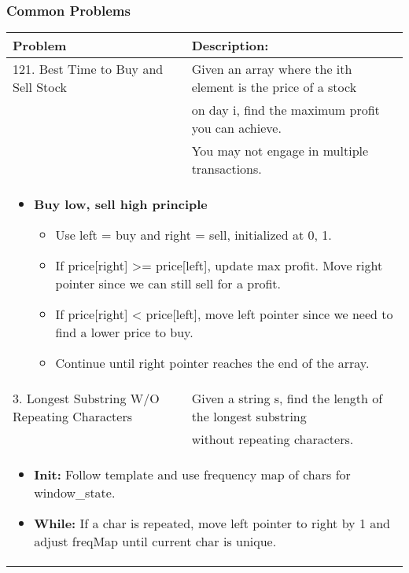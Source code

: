 \subsubsection{Common Problems}
\begin{summary}
    \begin{center}
        \begin{tabular}{ll}
            \toprule
            \textbf{Problem} & \textbf{Description:} \\
            \midrule
            121. Best Time to Buy and Sell Stock & Given an array where the ith element is the price of a stock \\ 
            & on day i, find the maximum profit you can achieve. \\ 
            & You may not engage in multiple transactions. \\
            \multicolumn{2}{p{\linewidth}}{
                \begin{itemize}
                    \item \textbf{Buy low, sell high principle}
                    \begin{itemize}
                        \item Use left = buy and right = sell, initialized at 0, 1. 
                        \item If price[right] >= price[left], update max profit. Move right pointer since we can still sell for a profit.
                        \item If price[right] < price[left], move left pointer since we need to find a lower price to buy.
                        \item Continue until right pointer reaches the end of the array.
                    \end{itemize}
                \end{itemize}
            } \\
            \midrule
            3. Longest Substring W/O Repeating Characters & Given a string s, find the length of the longest substring \\
            & without repeating characters. \\
            \multicolumn{2}{p{\linewidth}}{
                \begin{itemize}
                    \item \textbf{Init:} Follow template and use frequency map of chars for window\_state.
                    \item \textbf{While:} If a char is repeated, move left pointer to right by 1 and adjust freqMap until current char is unique. 

\end{itemize}}
\end{tabular}
\end{center}
\end{summary}
